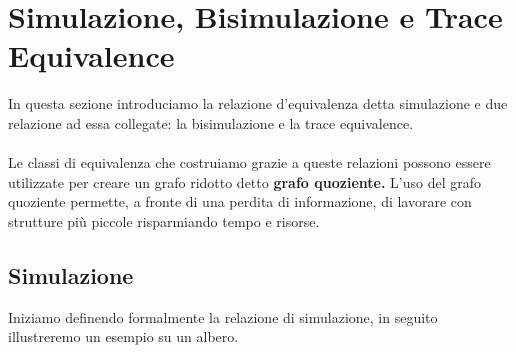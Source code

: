 \section{Simulazione, Bisimulazione e Trace Equivalence}
In questa sezione introduciamo la relazione d'equivalenza detta simulazione e due relazione ad essa collegate: la bisimulazione e la trace equivalence.
\\\\
Le classi di equivalenza che costruiamo grazie a queste relazioni possono essere utilizzate per creare un grafo ridotto detto \textbf{grafo quoziente.}
L'uso del grafo quoziente permette, a fronte di una perdita di informazione, di lavorare con strutture più piccole risparmiando tempo e risorse.

\subsection{Simulazione}
Iniziamo definendo formalmente la relazione di simulazione, in seguito illustreremo un esempio su un albero.

